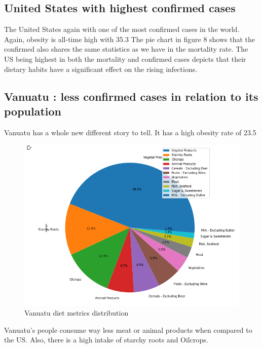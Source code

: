 \documentclass[journal,twoside,web]{ieeecolor}
\begin{document}
\subsection{United States with highest confirmed cases}
The United States again with one of the most confirmed cases in the world.
Again, obesity is all-time high with 35.3%
The pie chart in figure 8 shows that the confirmed also shares the same statistics as we have in the mortality rate. The US being highest in both the mortality and confirmed cases depicts that their dietary habits have a significant effect on the rising infections.


\subsection{Vanuatu : less confirmed cases in relation to its population}
Vanuatu has a whole new different story to tell. It has a high obesity rate of 23.5%

\begin{figure}[!t]
\centerline{\includegraphics[width=\columnwidth]{profig9.png}}
\caption{Vanuatu diet metrics distribution}
\label{fig1}
\end{figure}

Vanuatu's people consume way less meat or animal products when compared to the US. Also, there is a high intake of starchy roots and Oilcrops.
\end{document}
